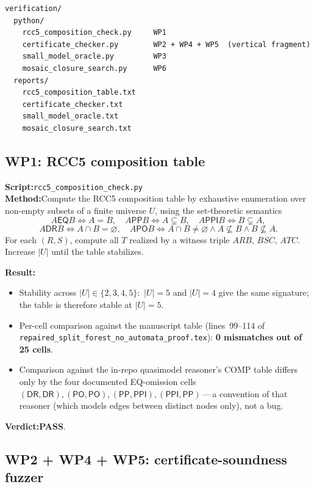 \documentclass[11pt]{article}
\newcommand{\EQ}{\mathsf{EQ}}
\newcommand{\PP}{\mathsf{PP}}
\newcommand{\PPI}{\mathsf{PPI}}
\newcommand{\PO}{\mathsf{PO}}
\newcommand{\DR}{\mathsf{DR}}
\newcommand{\PASS}{\textcolor{black!70!green}{\textbf{PASS}}}
\begin{document}
\begin{lstlisting}
verification/
  python/
    rcc5_composition_check.py     WP1
    certificate_checker.py        WP2 + WP4 + WP5  (vertical fragment)
    small_model_oracle.py         WP3
    mosaic_closure_search.py      WP6
  reports/
    rcc5_composition_table.txt
    certificate_checker.txt
    small_model_oracle.txt
    mosaic_closure_search.txt
\end{lstlisting}

\subsection{WP1: RCC5 composition table}

\textbf{Script:}\quad \texttt{rcc5\_composition\_check.py}\\
\textbf{Method:}\quad Compute the RCC5 composition table by
exhaustive enumeration over non-empty subsets of a finite universe
\(U\), using the set-theoretic semantics
\[
A\EQ B \iff A=B,\quad
A\PP B \iff A\subsetneq B,\quad
A\PPI B \iff B\subsetneq A,
\]
\[
A\DR B \iff A\cap B=\varnothing,\quad
A\PO B \iff A\cap B\neq\varnothing\wedge A\nsubseteq B\wedge B\nsubseteq A.
\]
For each \((R,S)\), compute all \(T\) realized by a witness triple
\(A R B\), \(B S C\), \(A T C\).  Increase \(|U|\) until the table
stabilizes.

\textbf{Result:}
\begin{itemize}[leftmargin=2em]
  \item Stability across \(|U| \in \{2,3,4,5\}\):\ \(|U|=5\) and
    \(|U|=4\) give the same signature; the table is therefore
    stable at \(|U|=5\).
  \item Per-cell comparison against the manuscript table
    (lines~99--114 of \texttt{repaired\_split\_forest\_no\_auto\-mata\_proof.tex}):
    \textbf{0 mismatches out of 25 cells}.
  \item Comparison against the in-repo quasimodel reasoner's COMP
    table differs only by the four documented EQ-omission cells
    \((\DR,\DR),(\PO,\PO),(\PP,\PPI),(\PPI,\PP)\)\,---\,a
    convention of that reasoner (which models edges between
    distinct nodes only), not a bug.
\end{itemize}

\textbf{Verdict:}\quad \PASS{}.

\subsection{WP2 + WP4 + WP5: certificate-soundness fuzzer}
\end{document}
